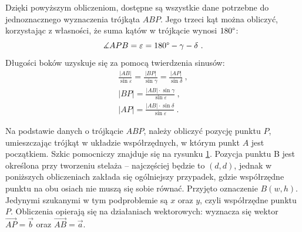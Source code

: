 Dzięki powyższym obliczeniom, dostępne są wszystkie dane potrzebne do jednoznacznego wyznaczenia trójkąta $ABP$. Jego trzeci kąt można obliczyć, korzystając z własności, że suma kątów w trójkącie wynosi $180\degree$:
\[
\measuredangle APB = \varepsilon = 180\degree - \gamma - \delta\ .
\]
Długości boków uzyskuje się za pomocą twierdzenia sinusów:
\begin{gather*}
\frac{|AB|}{\sin\varepsilon} = \frac{|BP|}{\sin\gamma} = \frac{|AP|}{\sin\delta}\ , \\[1em]
|BP| = \frac{|AB| \cdot \sin\gamma}{\sin\varepsilon}\ , \\[1em]
|AP| = \frac{|AB| \cdot \sin\delta}{\sin\varepsilon}\ .
\end{gather*}

Na podstawie danych o trójkącie $ABP$, należy obliczyć pozycję punktu $P$, umieszczając trójkąt w układzie współrzędnych, w którym punkt $A$ jest początkiem. Szkic pomocniczy znajduje się na rysunku \ref{trojkat_kartezjanskie}. Pozycja punktu B jest określona przy tworzeniu stelaża -- najczęściej będzie to $(d, d)$, jednak w poniższych obliczeniach zakłada się ogólniejszy przypadek, gdzie współrzędne punktu na obu osiach nie muszą się sobie równać. Przyjęto oznaczenie $B(w, h)$. Jedynymi szukanymi w tym podproblemie są $x$ oraz $y$, czyli współrzędne punktu $P$. Obliczenia opierają się na działaniach wektorowych: wyznacza się wektor $\overrightarrow{AP} = \overrightarrow{b}$ oraz $\overrightarrow{AB} = \overrightarrow{a}$.

\begin{figure}[h!]
\begin{center}

\end{center}
\label{trojkat_kartezjanskie}
\end{figure} 

